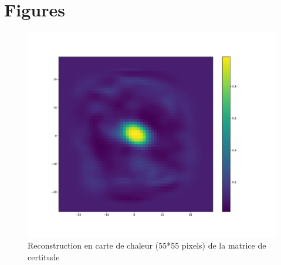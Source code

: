 
\chapter{Figures} %

\label{Figures} %



\begin{table}
\caption[Tableau]{Matériel utilisé pour réaliser les modélisations
}
\label{tab:materiel}
\end{table}

\begin{figure}[th]
\centering
\includegraphics[scale=0.4]{Figures/accuracy}
\decoRule
\caption[Figure]{Reconstruction en carte de chaleur (55*55 pixels) de la matrice de certitude}
\label{fig:accuracy}
\end{figure}

